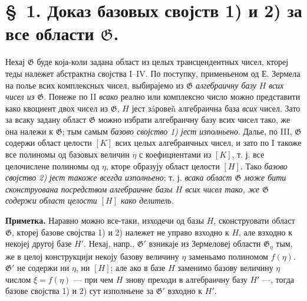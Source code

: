 ﻿\documentclass[11pt]{article}
\begin{document}
\section*{\S\ 1. Доказ базовых својств 1) и 2) за все области $\mathfrak G$.}

Нехај $\mathfrak G$ буде која-коли задана област из целых трансцендентных чисел, ктореј теды належет абстрактна својства I--IV. По поступку, применьеном од Е. Зермела на полье всих комплексных чисел, выбирајемо из $\mathfrak G$ {\itshape алгебраичну базу} $H$ {\itshape всих чисел из $\mathfrak G$}. Понеже по II {\itshape всако} реално или комплексно число можно представити како квоциент двох чисел из $\mathfrak G$, $H$ јест зáровеň алгебраична база {\itshape всих} чисел. Зато за всаку задану област $\mathfrak G$ можно избрати алгебраичну базу всих чисел тако, же она належи к $\mathfrak G$; тым самым {\itshape базово својство 1) јест изполньено}. Далье, по III, $\mathfrak G$ содержи област целости $[K]$ всих целых алгебраичных чисел, и зато по I такоже все полиномы од базовых величин $\eta$ с коефициентами из $[K]$, т. ј. все целочислене полиномы од $\eta$, кторе образују област целости $[H]$. Тако {\itshape базово својство 2) јест такоже всегда изполньено}; т. ј. {\itshape всака област $\mathfrak G$ може бити сконструована посредством алгебраичне базы $H$ всих чисел тако, же $\mathfrak G$ содержи област целости $[H]$ како делитель.}

\textbf{Приметка.} Наравно можно все-таки, изходечи од базы $H$, сконструовати област $\mathfrak G$, ктореј базове својства 1) и 2) належет не управо взходно к $H$, але взходно к некојеј другој базе $H'$. Нехај, напр., $\mathfrak G'$ взникаје из Зермеловеј области $\mathfrak G_\eta$ тым, же в целој конструкцији некоју базову величину $\eta$ заменьамо полиномом $f(\eta)$. $\mathfrak G'$ не содержи ни $\eta$, ни $[H]$; але ако в базе $H$ заменимо базову величину $\eta$ числом $\xi=f(\eta)$ --- при чем $H$ знову преходи в алгебраичну базу $H'$ ---, тогда базове својства 1) и 2) сут изполньене за $\mathfrak G'$ взходно к $H'$.
\end{document}

